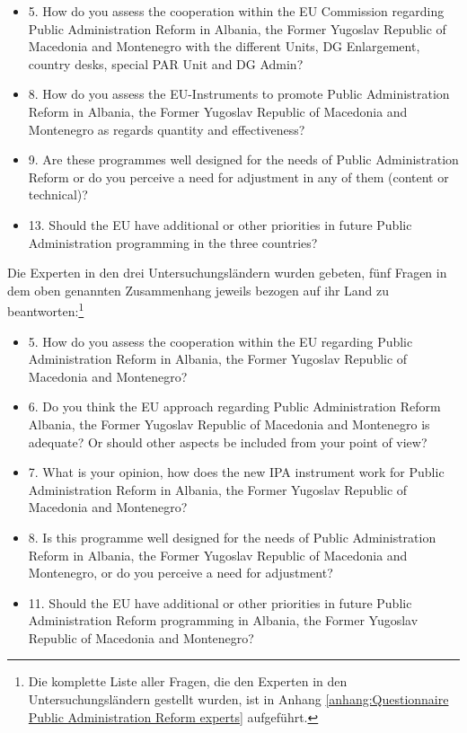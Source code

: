 \begin{itemize} \itemsep1pt \parskip0pt 
\item 5. How do you assess the cooperation within the EU Commission regarding Public Administration Reform in Albania, the Former Yugoslav Republic of Macedonia and Montenegro with the different Units, DG Enlargement, country desks, special PAR Unit and DG Admin?
\item 8. How do you assess the EU-Instruments to promote Public Administration Reform in Albania, the Former Yugoslav Republic of Macedonia and Montenegro as regards quantity and effectiveness?
\item 9. Are these programmes well designed for the needs of Public Administration Reform or do you perceive a need for adjustment in any of them (content or technical)?
\item 13. Should the EU have additional or other priorities in future Public Administration programming in the three countries?
\end{itemize}
Die Experten in den drei Untersuchungsländern wurden gebeten, fünf Fragen in dem oben genannten Zusammenhang jeweils bezogen auf ihr Land zu beantworten:\footnote{Die komplette Liste aller Fragen, die den Experten in den Untersuchungsländern gestellt wurden, ist in Anhang \ref{anhang:Questionnaire Public Administration Reform experts} aufgeführt.}
\begin{itemize} \itemsep1pt \parskip0pt 
\item 5. How do you assess the cooperation within the EU regarding Public Administration Reform in Albania, the Former Yugoslav Republic of Macedonia and Montenegro?
\item 6. Do you think the EU approach regarding Public Administration Reform Albania, the Former Yugoslav Republic of Macedonia and Montenegro is adequate? Or should other aspects be included from your point of view?
\item 7. What is your opinion, how does the new IPA instrument work for Public Administration Reform in Albania, the Former Yugoslav Republic of Macedonia and Montenegro? 
\item 8. Is this programme well designed for the needs of Public Administration Reform in Albania, the Former Yugoslav Republic of Macedonia and Montenegro, or do you perceive a need for adjustment?
\item 11. Should the EU have additional or other priorities in future Public Administration Reform programming in Albania, the Former Yugoslav Republic of Macedonia and Montenegro?
\end{itemize}

